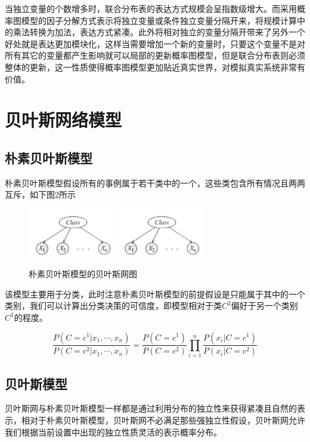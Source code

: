 \documentclass{article} %
\begin{document}
\begin{CJK*}{UTF8}{gkai}
当独立变量的个数增多时，联合分布表的表达方式规模会呈指数级增大。而采用概率图模型的因子分解方式表示将独立变量或条件独立变量分隔开来，将规模计算中的乘法转换为加法，表达方式紧凑。此外将相对独立的变量分隔开带来了另外一个好处就是表达更加模块化，这样当需要增加一个新的变量时，只要这个变量不是对所有其它的变量都产生影响就可以局部的更新概率图模型，但是联合分布表则必须整体的更新，这一性质使得概率图模型更加贴近真实世界，对模拟真实系统非常有价值。

\section{贝叶斯网络模型}
\subsection{朴素贝叶斯模型}
朴素贝叶斯模型假设所有的事例属于若干类中的一个，这些类包含所有情况且两两互斥，如下图2所示

\begin{figure}[h]
\begin{center}

\includegraphics[width=1.5in]{2.png}
\includegraphics[width=1.5in]{2.png}

\end{center}
\caption{朴素贝叶斯模型的贝叶斯网图}
\end{figure}

该模型主要用于分类，此时注意朴素贝叶斯模型的前提假设是只能属于其中的一个类别，我们可以计算出分类决策的可信度，即模型相对于类$C^{2}$偏好于另一个类别$C^{1}$的程度。

\begin{equation}
\frac{P \left( C=c^{1}\vert x_{1},\cdots,x_{n} \right)}{P \left( C=c^{2}\vert x_{1},\cdots,x_{n} \right)} = \frac{P \left( C=c^{1} \right)}{P \left( C=c^{2} \right)}\prod_{i=1}^n \frac{P \left( x_{i}\vert C=c^{1} \right)}{P \left( x_{i}\vert C=c^{2} \right)}
\end{equation}

\subsection{贝叶斯模型}
贝叶斯网与朴素贝叶斯模型一样都是通过利用分布的独立性来获得紧凑且自然的表示，相对于朴素贝叶斯模型，贝叶斯网不必满足那些强独立性假设，贝叶斯网允许我们根据当前设置中出现的独立性质灵活的表示概率分布。


\end{CJK*}
\end{document}
